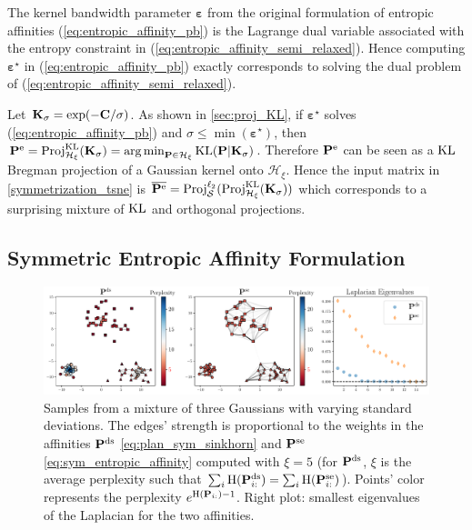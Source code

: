 \begin{remark}
  The kernel bandwidth parameter $\bm{\varepsilon}$ from the original formulation of entropic affinities (\ref{eq:entropic_affinity_pb}) is the Lagrange dual variable associated with the entropy constraint in (\ref{eq:entropic_affinity_semi_relaxed}). Hence computing $\bm{\varepsilon}^\star$ in (\ref{eq:entropic_affinity_pb}) exactly corresponds to solving the dual problem of (\ref{eq:entropic_affinity_semi_relaxed}).
\end{remark}

\begin{remark}\label{Pe_proj}
  Let $\mathbf{K}_{\sigma} = \exp(-\mathbf{C} / \sigma)$. As shown in \cref{sec:proj_KL}, if $\bm{\varepsilon}^\star$ solves (\ref{eq:entropic_affinity_pb}) and $\sigma \leq \min(\bm{\varepsilon}^\star)$, then $\mathbf{P}^{\mathrm{e}} = \operatorname{Proj}^{\operatorname{\operatorname{KL}}}_{\mathcal{H}_{\xi}}(\mathbf{K}_{\sigma})  =  \operatorname*{arg\,min}_{\mathbf{P} \in \mathcal{H}_{\xi}} \operatorname{KL}(\mathbf{P} | \mathbf{K}_\sigma)$.
  Therefore $\mathbf{P}^{\mathrm{e}}$ can be seen as a $\operatorname{KL}$ Bregman projection \citep{benamou2015iterative} of a Gaussian kernel onto $\mathcal{H}_{\xi}$. Hence the input matrix in \eqref{symmetrization_tsne}  is $\overline{\mathbf{P}^{\mathrm{e}}}= \operatorname{Proj}^{\ell_2}_{\mathcal{S}}(\operatorname{Proj}^{\operatorname{\operatorname{KL}}}_{\mathcal{H}_{\xi}}(\mathbf{K}_\sigma))$ which corresponds to a surprising mixture of $\operatorname{KL}$ and orthogonal projections.
\end{remark}

\subsection{Symmetric Entropic Affinity Formulation}\label{subsec:sea}

\begin{figure}[t]
  \begin{center}
  \centerline{\includegraphics[width=\columnwidth]{figures/SNEkhorn/Ps_vs_Pse.pdf}}
  \caption{Samples from a mixture of three Gaussians with varying standard deviations. The edges' strength is proportional to the weights in the affinities $\mathbf{P}^{\mathrm{ds}}$ \eqref{eq:plan_sym_sinkhorn} and $\mathbf{P}^{\mathrm{se}}$ \eqref{eq:sym_entropic_affinity} computed with $\xi=5$ (for $\mathbf{P}^{\mathrm{ds}}$, $\xi$ is the average perplexity such that $\sum_i \operatorname{H}(\mathbf{P}^{\mathrm{ds}}_{i:})=\sum_i \operatorname{H}(\mathbf{P}^{\mathrm{se}}_{i:})$). Points' color represents the perplexity $e^{\operatorname{H}(\mathbf{P}_{i:})-1}$. Right plot: smallest eigenvalues of the Laplacian for the two affinities.}
  \label{fig:Ps_vs_Pse}
  \end{center}
\end{figure}

